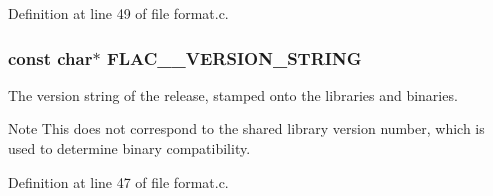 Definition at line 49 of file format.\+c.

\subsubsection[{\texorpdfstring{F\+L\+A\+C\+\_\+\+\_\+\+V\+E\+R\+S\+I\+O\+N\+\_\+\+S\+T\+R\+I\+NG}{FLAC__VERSION_STRING}}]{ {\bf const} char$\ast$ F\+L\+A\+C\+\_\+\+\_\+\+V\+E\+R\+S\+I\+O\+N\+\_\+\+S\+T\+R\+I\+NG}\hypertarget{group__flac__format_ga1bd3aa4d4ce0393e51dd55bb3e48fbc1}{}\label{group__flac__format_ga1bd3aa4d4ce0393e51dd55bb3e48fbc1}
The version string of the release, stamped onto the libraries and binaries.

\begin{DoxyNote}{Note}
This does not correspond to the shared library version number, which is used to determine binary compatibility. 
\end{DoxyNote}


Definition at line 47 of file format.\+c.

